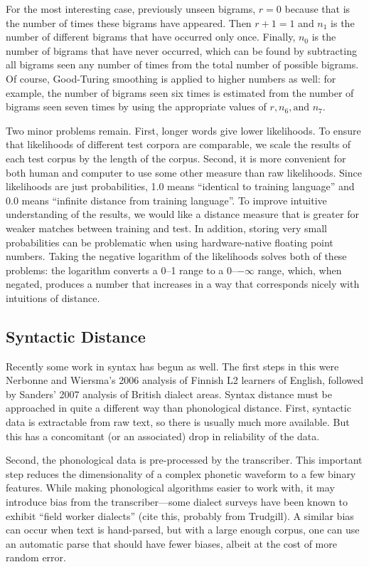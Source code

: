 \documentclass[11pt]{article}
\begin{document}
For the most interesting case, previously unseen bigrams, $r=0$
because that is the number of times these bigrams have
appeared. Then $r+1=1$ and $n_1$ is the number of different
bigrams that have occurred only once. Finally, $n_0$ is the number of
bigrams that have never occurred, which can be found by subtracting
all bigrams seen any number of times from the total number of possible
bigrams. Of course, Good-Turing smoothing is applied to
higher numbers as well: for example, the number of bigrams seen six
times is estimated from the number of bigrams seen seven times by
using the appropriate values of $r, n_6, \textrm{and } n_7$.

Two minor problems remain. First, longer words give lower likelihoods. To ensure
that likelihoods of different test corpora are
comparable, we scale the results of each test corpus by the length of
the corpus.
Second, it is more convenient for both human and computer to use
some other measure than raw likelihoods. Since likelihoods are just
probabilities, 1.0 means ``identical to training language'' and 0.0 means
``infinite distance from training language''.
To improve intuitive understanding of the results, we
would like a distance measure that is greater
for weaker matches between training and test. In addition, storing very small
probabilities can be problematic when using hardware-native floating
point numbers.
Taking the negative logarithm of the likelihoods solves both of these
problems: the logarithm converts a 0--1 range to a 0--$-\infty$ range,
which, when negated, produces a number that increases in a way that
corresponds nicely with intuitions of distance.

\subsection{Syntactic  Distance}
Recently some work in syntax has begun as well. The first steps in
this were Nerbonne and Wiersma's 2006 analysis of Finnish L2 learners
of English, followed by Sanders' 2007 analysis of British dialect
areas. Syntax distance must be approached in quite a different way than
phonological distance. First, syntactic data is extractable from raw
text, so there is usually much more available. But this has a
concomitant (or an associated) drop in reliability of the
data.

Second, the phonological data is pre-processed by the
transcriber. This important step reduces the dimensionality of a
complex phonetic waveform to a few binary features. While making
phonological algorithms easier to work with, it may introduce bias
from the transcriber---some dialect surveys have been known to exhibit
``field worker dialects'' (cite this, probably from Trudgill). A
similar bias can occur when text is hand-parsed, but with a
large enough corpus, one can use an automatic parse that should have
fewer biases, albeit at the cost of more random error.
\end{document}
